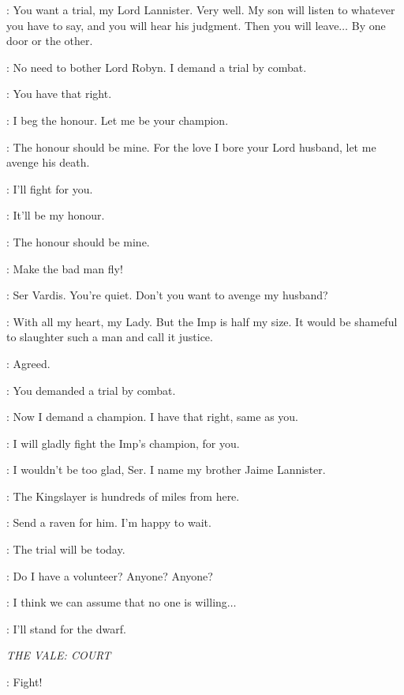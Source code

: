 \LYSA: You want a trial, my Lord Lannister. Very well. My son will listen to whatever you have to say, and you will hear his judgment. Then you will leave$\ldots$ By one door or the other. 

\TYRION: No need to bother Lord Robyn. I demand a trial by combat. 

\LYSA: You have that right. 

\KNIGHTa: I beg the honour. Let me be your champion. 

\KNIGHTb: The honour should be mine. For the love I bore your Lord husband, let me avenge his death. 

\KNIGHTc: I'll fight for you. 

\KNIGHTd: It'll be my honour. 

\KNIGHTe: The honour should be mine. 

\ROBYN: Make the bad man fly! 

\LYSA: Ser Vardis. You're quiet. Don't you want to avenge my husband? 

\VARDIS: With all my heart, my Lady. But the Imp is half my size. It would be shameful to slaughter such a man and call it justice. 

\TYRION: Agreed. 

\LYSA: You demanded a trial by combat. 

\TYRION: Now I demand a champion. I have that right, same as you. 

\VARDIS: I will gladly fight the Imp's champion, for you. 

\TYRION: I wouldn't be too glad, Ser. I name my brother Jaime Lannister. 

\LYSA: The Kingslayer is hundreds of miles from here. 

\TYRION: Send a raven for him. I'm happy to wait. 

\LYSA: The trial will be today. 

\TYRION: Do I have a volunteer? Anyone? Anyone? 

\LYSA: I think we can assume that no one is willing$\ldots$ 

\BRONN: I'll stand for the dwarf. 

\scene

\textit{THE VALE: COURT} 


\ROBYN: Fight!


